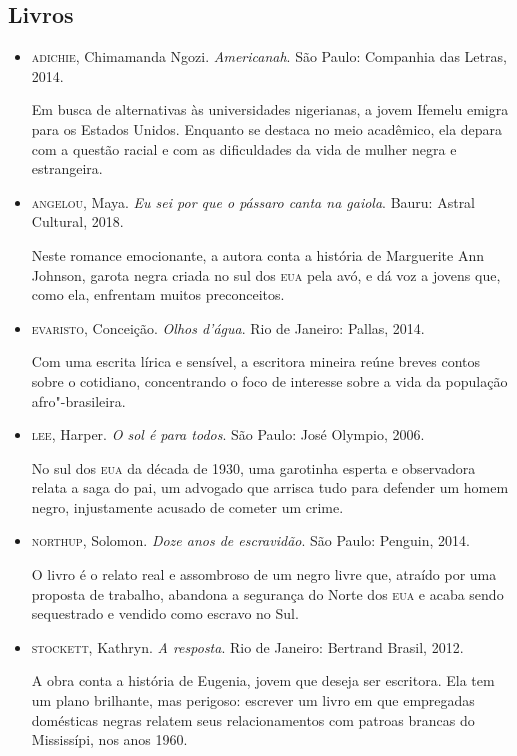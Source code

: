 \documentclass[11pt]{extarticle}
\begin{document}
\subsection{Livros}
\begin{itemize}
\item\textsc{adichie}, Chimamanda Ngozi. \textit{Americanah}. São Paulo: Companhia
  das Letras, 2014.

Em busca de alternativas às universidades nigerianas, a jovem Ifemelu
emigra para os Estados Unidos. Enquanto se destaca no meio acadêmico,
ela depara com a questão racial e com as dificuldades da vida de mulher
negra e estrangeira.

\item\textsc{angelou}, Maya. \textit{Eu sei por que o pássaro canta na gaiola}.
  Bauru: Astral Cultural, 2018.

Neste romance emocionante, a autora conta a história de Marguerite Ann
Johnson, garota negra criada no sul dos \textsc{eua} pela avó, e dá voz a jovens
que, como ela, enfrentam muitos preconceitos.

\item\textsc{evaristo}, Conceição. \textit{Olhos d'água}. Rio de Janeiro: Pallas,
  2014.

Com uma escrita lírica e sensível, a escritora mineira reúne breves
contos sobre o cotidiano, concentrando o foco de interesse sobre a vida
da população afro"-brasileira.

\item\textsc{lee}, Harper. \textit{O sol é para todos}. São Paulo: José Olympio,
  2006.

No sul dos \textsc{eua} da década de 1930, uma garotinha esperta e observadora
relata a saga do pai, um advogado que arrisca tudo para defender um
homem negro, injustamente acusado de cometer um crime.

\item\textsc{northup}, Solomon. \textit{Doze anos de escravidão}. São Paulo:
  Penguin, 2014.

O livro é o relato real e assombroso de um negro livre que, atraído por
uma proposta de trabalho, abandona a segurança do Norte dos \textsc{eua} e acaba
sendo sequestrado e vendido como escravo no Sul.

\item\textsc{stockett}, Kathryn. \textit{A resposta}. Rio de Janeiro: Bertrand
  Brasil, 2012.

A obra conta a história de Eugenia, jovem que deseja ser escritora. Ela
tem um plano brilhante, mas perigoso: escrever um livro em que
empregadas domésticas negras relatem seus relacionamentos com patroas
brancas do Mississípi, nos anos 1960.


\end{itemize}
\end{document}
